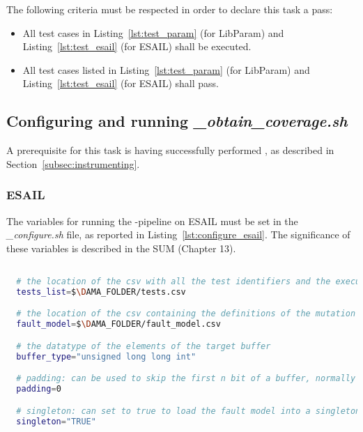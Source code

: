   The following criteria must be respected in order to declare this task a pass:

  \begin{itemize}
    \item All test cases in Listing~\ref{lst:test_param} (for LibParam) and Listing~\ref{lst:test_esail} (for ESAIL) shall be executed.
    \item All test cases listed in Listing~\ref{lst:test_param} (for LibParam) and Listing~\ref{lst:test_esail} (for ESAIL) shall pass.
  \end{itemize}

\subsection{Configuring and running \emph{\DAMA\_obtain\_coverage.sh}}

A prerequisite for this task is having successfully performed , as described in Section~\ref{subsec:instrumenting}.

\subsubsection{ESAIL}

The variables for running the \DAMA-pipeline on ESAIL must be set in the \emph{\DAMA\_configure.sh} file, as reported in Listing~\ref{lst:configure_esail}. The significance of these variables is described in the SUM (Chapter 13).

  \begin{lstlisting}[language=bash, label={lst:configure_esail}]

  # the location of the csv with all the test identifiers and the execution time
  tests_list=$\DAMA_FOLDER/tests.csv

  # the location of the csv containing the definitions of the mutation operators
  fault_model=$\DAMA_FOLDER/fault_model.csv

  # the datatype of the elements of the target buffer
  buffer_type="unsigned long long int"

  # padding: can be used to skip the first n bit of a buffer, normally set to 0
  padding=0

  # singleton: can set to true to load the fault model into a singleton   variable, normally set to "TRUE", can also  be set to "FALSE"
  singleton="TRUE"

  \end{lstlisting}

